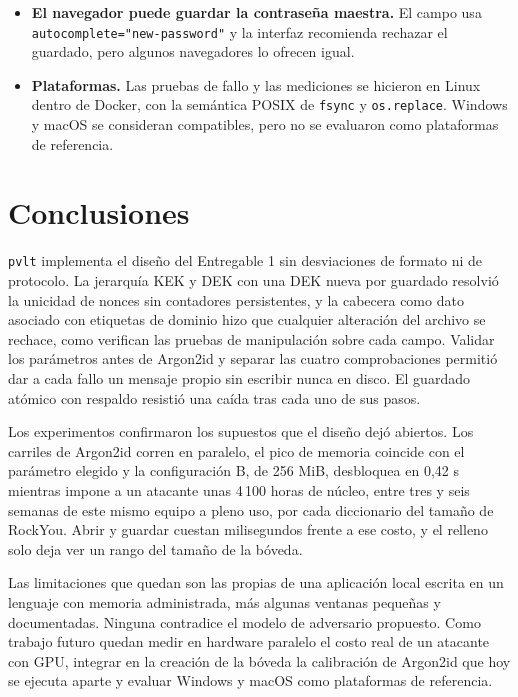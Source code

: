 \documentclass[11pt,letterpaper]{article}
\newcommand{\code}[1]{\texttt{#1}}
\newcommand{\pvlt}{\code{pvlt}}
\begin{document}
\begin{itemize}
\item \textbf{El navegador puede guardar la contraseña maestra.} El campo usa \code{autocomplete="new-password"} y la interfaz recomienda rechazar el guardado, pero algunos navegadores lo ofrecen igual.
\item \textbf{Plataformas.} Las pruebas de fallo y las mediciones se hicieron en Linux dentro de Docker, con la semántica POSIX de \code{fsync} y \code{os.replace}. Windows y macOS se consideran compatibles, pero no se evaluaron como plataformas de referencia.
\end{itemize}

\section{Conclusiones}

\pvlt{} implementa el diseño del Entregable 1 sin desviaciones de formato ni de protocolo. La jerarquía KEK y DEK con una DEK nueva por guardado resolvió la unicidad de nonces sin contadores persistentes, y la cabecera como dato asociado con etiquetas de dominio hizo que cualquier alteración del archivo se rechace, como verifican las pruebas de manipulación sobre cada campo. Validar los parámetros antes de Argon2id y separar las cuatro comprobaciones permitió dar a cada fallo un mensaje propio sin escribir nunca en disco. El guardado atómico con respaldo resistió una caída tras cada uno de sus pasos.

Los experimentos confirmaron los supuestos que el diseño dejó abiertos. Los carriles de Argon2id corren en paralelo, el pico de memoria coincide con el parámetro elegido y la configuración B, de 256 MiB, desbloquea en 0,42 s mientras impone a un atacante unas 4\,100 horas de núcleo, entre tres y seis semanas de este mismo equipo a pleno uso, por cada diccionario del tamaño de RockYou. Abrir y guardar cuestan milisegundos frente a ese costo, y el relleno solo deja ver un rango del tamaño de la bóveda.

Las limitaciones que quedan son las propias de una aplicación local escrita en un lenguaje con memoria administrada, más algunas ventanas pequeñas y documentadas. Ninguna contradice el modelo de adversario propuesto. Como trabajo futuro quedan medir en hardware paralelo el costo real de un atacante con GPU, integrar en la creación de la bóveda la calibración de Argon2id que hoy se ejecuta aparte y evaluar Windows y macOS como plataformas de referencia.
\end{document}
